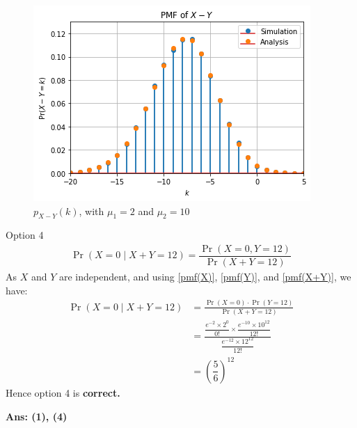 \documentclass{beamer}
\providecommand{\pr}[1]{\ensuremath{\Pr\left(#1\right)}}
\begin{document}
    \begin{frame}{}
\begin{figure}[h!]\label{graph_X-Y}
    \centering
      \includegraphics[width=0.85\columnwidth]{Figures/pmf(X-Y).png}
     \caption{$p_{X-Y}(k)$, with $\mu_1=2$ and $\mu_2=10$}
\end{figure}
    \end{frame}
    \begin{frame}
    \begin{block}{Option 4}\vspace{-4mm}
        \begin{align}
        \pr{X=0\mid X+Y=12} = \dfrac{\pr{X=0, Y=12}}{\pr{X+Y=12}}
    \end{align}
    As $X$ and $Y$ are independent, and using \eqref{pmf(X)}, \eqref{pmf(Y)}, and \eqref{pmf(X+Y)}, we have:
    \begin{align}
        \pr{X=0\mid X+Y=12} &= \frac{\pr{X=0} \cdot \pr{Y=12}}{\pr{X+Y=12}} \\
        &= \frac{\dfrac{e^{-2}\times 2^{0}}{0!} \times \dfrac{e^{-10}\times10^{12}}{12!}}{\dfrac{e^{-12}\times12^{12}}{12!}}\\
        &= \left(\dfrac{5}{6}\right)^{12}
    \end{align}
    Hence option 4 is \textbf{correct.}
    \end{block}
\textbf{Ans: (1), (4)}
\end{frame}
\end{document}
